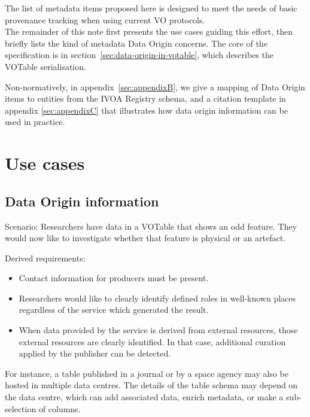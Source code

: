 \documentclass[11pt,a4paper]{ivoa}
\begin{document}
The list of metadata items proposed here is designed to meet the needs of basic provenance
tracking when using current VO protocols.\\


The remainder of this note first presents the use cases guiding this
effort, then briefly lists the kind of metadata Data Origin concerns.
The core of the specification is in
section~\ref{sec:data-origin-in-votable}, which
describes the VOTable serialisation.

Non-normatively, in appendix~\ref{sec:appendixB}, we give a mapping of Data Origin items to entities from the IVOA Registry schema, and a citation template in appendix \ref{sec:appendixC}
that illustrates how data origin information can be used in practice.



\section{Use cases}

\subsection{Data Origin information}

Scenario: Researchers have data in a VOTable that shows an odd feature. They would now like to investigate whether that feature is physical or an artefact.

Derived requirements:

\begin{itemize}
\item Contact information for producers must be present.

\item Researchers would like to clearly identify defined roles in well-known places regardless of the service which generated the result.

\item When data provided by the service is derived from external resources, those external resources are clearly identified.  In that case, additional curation applied by the publisher can be detected.
\end{itemize}

For instance, a table published in a journal or by a space agency may also be hosted in multiple data centres. The details of the table schema may depend on the data centre, which can add associated data, enrich metadata, or make a sub-selection of columns.
\end{document}
